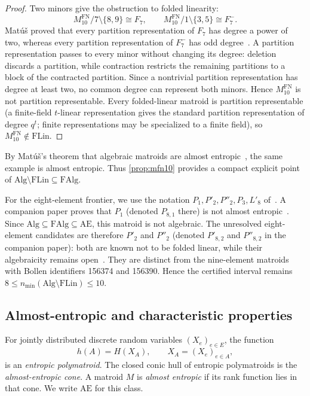 \documentclass[11pt]{article}
\theoremstyle{definition}
\newcommand{\FAlg}{\mathrm{FAlg}}
\newcommand{\FLin}{\mathrm{FLin}}
\newcommand{\Alg}{\mathrm{Alg}}
\newcommand{\AlmostEnt}{\mathrm{AE}}
\begin{document}
\begin{proof}
Two minors give the obstruction to folded linearity:
\begin{equation}\label{eq:mfn-minors}
M^{\mathrm{FN}}_{10}/7\setminus\{8,9\}\cong F_7,
\qquad
M^{\mathrm{FN}}_{10}/1\setminus\{3,5\}\cong F_7^-.
\end{equation}
Mat\'u\v{s} proved that every partition representation of $F_7$ has degree a power of two, whereas every partition representation of $F_7^-$ has odd degree~\cite[Proposition~4.1]{Matus1999}.  A partition representation passes to every minor without changing its degree: deletion discards a partition, while contraction restricts the remaining partitions to a block of the contracted partition.  Since a nontrivial partition representation has degree at least two, no common degree can represent both minors.  Hence $M^{\mathrm{FN}}_{10}$ is not partition representable.  Every folded-linear matroid is partition representable (a finite-field $t$-linear representation gives the standard partition representation of degree $q^t$; finite representations may be specialized to a finite field), so $M^{\mathrm{FN}}_{10}\notin\FLin$.
\end{proof}

By Mat\'u\v{s}'s theorem that algebraic matroids are almost entropic~\cite{Matus2024}, the same example is almost entropic.  Thus \cref{prop:mfn10} provides a compact explicit point of $\Alg\setminus\FLin\subseteq\FAlg$.

For the eight-element frontier, we use the notation $P_1,P'_2,P''_2,P_3,L'_8$ of~\cite{BamiloshinEtAl2021}.  A companion paper proves that $P_1$ (denoted $P_{8,1}$ there) is not almost entropic~\cite{KhazaeiP81}.  Since $\Alg\subseteq\FAlg\subseteq\AlmostEnt$, this matroid is not algebraic.  The unresolved eight-element candidates are therefore $P'_2$ and $P''_2$ (denoted $P'_{8,2}$ and $P''_{8,2}$ in the companion paper): both are known not to be folded linear, while their algebraicity remains open~\cite{BamiloshinFarrasPadro2025}.  They are distinct from the nine-element matroids with Bollen identifiers 156374 and 156390.  Hence the certified interval remains $8\le n_{\min}(\Alg\setminus\FLin)\le10$.

\subsection{Almost-entropic and characteristic properties}\label{subsec:ae-characteristics}

\begin{definition}\label{def:ae}
For jointly distributed discrete random variables $(X_e)_{e\in E}$, the function
\[
h(A)=H(X_A),
\qquad X_A=(X_e)_{e\in A},
\]
is an \emph{entropic polymatroid}.  The closed conic hull of entropic polymatroids is the \emph{almost-entropic cone}.  A matroid $M$ is \emph{almost entropic} if its rank function lies in that cone.  We write $\AlmostEnt$ for this class.
\end{definition}
\end{document}
